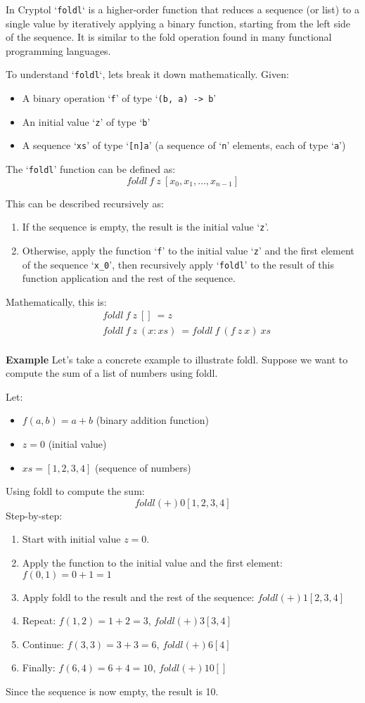 In Cryptol `\texttt{foldl}`  is a higher-order function that reduces a sequence (or list) to a single value by iteratively applying a binary function, starting from the left side of the sequence. It is similar to the fold operation found in many functional programming languages.

To understand `\texttt{foldl}`, lets break it down mathematically. Given: \begin{itemize}
	\item A binary operation `\texttt{f}' of type `\texttt{(b, a) -> b}'
	\item An initial value `\texttt{z}' of type `\texttt{b}'
	\item A sequence `\texttt{xs}' of type `\texttt{[n]a}' (a sequence of `\texttt{n}' elements, each of type `\texttt{a}')
\end{itemize}
The `\texttt{foldl}' function can be defined as: \[
foldl\ f\ z\ [x_0,x_1,\dots,x_{n-1}]
\]

This can be described recursively as:
\begin{enumerate}
	\item If the sequence is empty, the result is the initial value `\texttt{z}'.
	\item Otherwise, apply the function `\texttt{f}' to the initial value `\texttt{z}' and the first element of the sequence `\texttt{x\_0}', then recursively apply `\texttt{foldl}' to the result of this function application and the rest of the sequence.
\end{enumerate}
Mathematically, this is: \begin{align*}
	&foldl\ f\ z\ []\ = z \\
	&foldl\ f\ z\ (x:xs)\ = foldl\ f\ (f\ z\ x)\ xs \\
\end{align*}

\textbf{Example}
Let's take a concrete example to illustrate foldl. Suppose we want to compute the sum of a list of numbers using foldl.

Let:
\begin{itemize}
	\item $f(a, b) = a + b$ (binary addition function)
	\item $z = 0$ (initial value)
	\item $xs = [1, 2, 3, 4]$ (sequence of numbers)
\end{itemize}
Using foldl to compute the sum:
\[
foldl (+) 0 [1,2,3,4]
\]
Step-by-step:
\begin{enumerate}
	\item Start with initial value $z = 0$.
	\item Apply the function to the initial value and the first element:
	$f(0,1)=0+1=1$
	\item Apply foldl to the result and the rest of the sequence:
	$foldl (+) 1 [2,3,4]$
	\item Repeat:
	$f(1,2)=1+2=3$,
	$foldl (+) 3 [3,4]$
	\item Continue:
	$f(3,3)=3+3=6$,
	$foldl (+) 6 [4]$
	\item Finally:
	$f(6,4)=6+4=10$,
	$foldl (+) 10 [ ]$
\end{enumerate}
Since the sequence is now empty, the result is 10.

